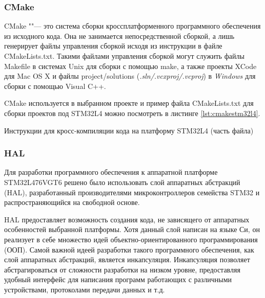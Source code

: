 \subsubsection{CMake}

CMake ""--- это система сборки кроссплатформенного программного обеспечения из 
исходного кода. 
Она не занимается непосредственной сборкой, а лишь генерирует файлы управления 
сборкой исходя из инструкции в файле CMakeLists.txt.
Такими файлами управления сборкой могут служить файлы Makefile в системах Unix 
для сборки с помощью make, а также проекты XCode для Mac OS X и файлы 
project/solutions (\textit{.sln/.vcxproj/.vcproj}) в \textit{Windows} для 
сборки с помощью Visual C++.

CMake используется в выбранном проекте и пример файла CMakeLists.txt для сборки 
проектов под STM32L4 можно посмотреть в листинге \ref{lst:cmakestm32l4}.

\begin{listing}[H]
\caption{Инструкции для кросс-компиляции кода на платформу STM32L4 (часть 
файла)} 
\label{lst:cmakestm32l4}
\end{listing}

\subsubsection{HAL}

Для разработки программного обеспечения к аппаратной платформе STM32L476VGT6 
решено было использовать слой аппаратных абстракций (HAL), разработанный 
производителями микроконтроллеров семейства STM32 и распространяющийся на 
свободной основе.

HAL предоставляет возможность создания кода, не зависящего от аппаратных 
особенностей выбранной платформы. 
Хотя данный слой написан на языке Си, он реализует в себе множество идей 
объектно-ориентированного программирования (ООП). 
Самой важной идеей разработки такого программного обеспечения, как слой 
аппаратных абстракций, является инкапсуляция.
Инкапсуляция позволяет абстрагироваться от сложности разработки на низком 
уровне, предоставляя удобный интерфейс для написания программ работающих с 
различными устройствами, протоколами передачи данных и т.д.


